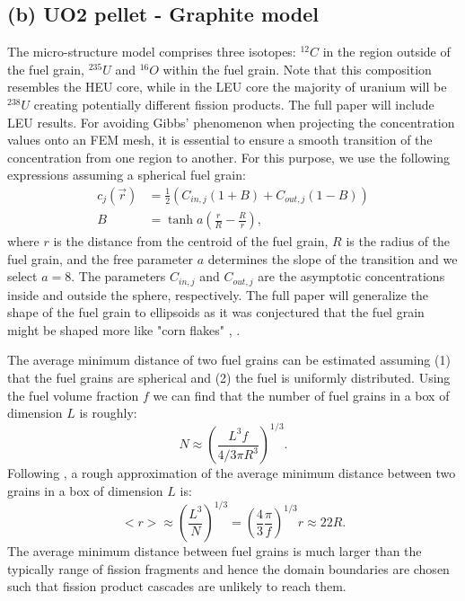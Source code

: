 \documentclass{anstrans}
\begin{document}
\subsection{(b) UO2 pellet - Graphite model}\label{sec:micro_model}
The micro-structure model comprises three isotopes: $^{12}C$ in the region outside of the fuel grain, $^{235}U$ and $^{16}O$ within the fuel grain. Note that this composition resembles the HEU core, while in the LEU core the majority of uranium will be $^{238}U$ creating potentially different fission products. The full paper will include LEU results.
For avoiding Gibbs' phenomenon when projecting the concentration values onto an FEM mesh, it is essential to ensure a smooth transition of the concentration from one region to another. For this purpose, we use the following expressions assuming a spherical fuel grain:
\begin{align}\label{eq:smooth_transition}
   c_j(\vec{r})& = \frac{1}{2} \left( C_{in,j}  \left( 1 + B \right) + C_{out,j}\left( 1 -B \right)  \right) \nonumber \\
   B &= \tanh a \left( \frac{r}{R}  - \frac{R}{r} \right),
\end{align}
where $r$ is the distance from the centroid of the fuel grain, $R$ is the radius of the fuel grain, and the free parameter $a$ determines the slope of the transition and we select $a=8$. The parameters $C_{in,j}$ and $C_{out,j}$ are the asymptotic concentrations inside and outside the sphere, respectively. The full paper will generalize the shape of the fuel grain to ellipsoids as it was conjectured that the fuel grain might be shaped more like "corn flakes" \cite{Mark}, \cite{GraphiteCore}.

The average minimum distance of two fuel grains can be estimated assuming (1) that the fuel grains are spherical and (2) the fuel is uniformly distributed. Using the fuel volume fraction $f$ we can find that the number of fuel grains in a box of dimension $L$ is roughly:
\begin{equation}
  N \approx \left( \frac{L^3 f}{4/3 \pi R^3} \right)^{1/3}.
\end{equation}
Following \cite{averagedistance}, a rough approximation of the average minimum distance between two grains in a box of dimension $L$ is:
\begin{equation}
   <r> \approx \left( \frac{L^3}{N} \right)^{1/3} = \left(\frac{4}{3} \frac{\pi}{f} \right)^{1/3} r \approx 22 R. 
\end{equation}
The average minimum distance between fuel grains is much larger than the typically range of fission fragments and hence the domain boundaries are chosen such that fission product cascades are unlikely to reach them.
\end{document}
